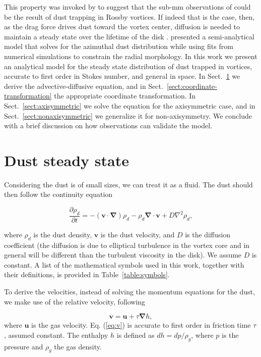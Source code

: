 \documentclass[apj]{emulateapj}
\newcommand{\pderiv}[2]{\frac{\partial #1}{\partial #2}}
\renewcommand{\v}[1]{{\boldsymbol{#1}}} %
\newcommand{\del}{\v{\nabla}}
\newcommand{\grad}{\del}
\newcommand{\Div}{\del\cdot}
\newcommand{\Laplace}{\nabla^2}
\newcommand{\Eq}[1]{Eq. (\ref{#1})}
\newcommand{\eq}[1]{\Eq{#1}}
\newcommand{\sect}[1]{Sect.~\ref{#1}}
\newcommand{\beq}{\begin{equation}}
\newcommand{\eeq}{\end{equation}}
\begin{document}
This property was invoked by \citet{Regaly12} to suggest that the 
sub-mm observations of \citet{Brown09} could be the result of dust
trapping in Rossby vortices. If indeed that is the case, then, 
as the drag force drives dust toward the vortex center, diffusion is
needed to maintain a steady state over the lifetime of the disk
\citep{Klahr-Henning97,Chavanis00}. \citet{Birnstiel13} presented a semi-analytical model that solves for the azimuthal dust 
distribution while using fits from numerical simulations
\citep{Pinilla12b} to constrain the radial morphology. In this work we present an analytical 
model for the steady state distribution of dust trapped in vortices, 
accurate to first order in Stokes number, and general in space. In 
\sect{sect:model-equations} we derive the
advective-diffusive equation, and in \sect{sect:coordinate-transformation} the appropriate coordinate
transformation. In \sect{sect:axisymmetric} we solve the equation for the axisymmetric
case, and in \sect{sect:nonaxisymmetric} we generalize it for non-axisymmetry. We conclude
with a brief discussion on how observations can validate the model. 

\section{Dust steady state} 
\label{sect:model-equations}

Considering the dust is of small sizes, we can treat it as a
fluid. The dust should then follow the continuity equation 

\beq
  \pderiv{\rho_d}{t} = -(\v{v}\cdot\del)\rho_d - \rho_d \Div{\v{v}} + D\Laplace{\rho_d},
  \label{eq:continuity}
\eeq

\noindent where $\rho_d$ is the dust density, $\v{v}$ is the dust
velocity, and $D$ is the diffusion coefficient (the diffusion is due
to elliptical turbulence in the vortex core and in general will be
different than the turbulent viscosity in the disk). We assume $D$ is
constant. A list of the mathematical symbols used in this work, together
with their definitions, is provided in Table~\ref{table:symbols}. 



To derive the velocities, instead of solving the momentum equations
for the dust, we make use of the relative velocity, following
\citet[see also \citealt{Youdin08}]{Youdin-Goodman05}

\beq
\v{v} = \v{u} + \tau  \grad{h}, 
\label{eq:v}
\eeq
\noindent where $\v{u}$ is the gas velocity. \eq{eq:v} is 
accurate to first order in friction time $\tau$, assumed 
constant. The enthalpy $h$ is defined as $dh = dp /\rho_g$, where $p$ 
is the pressure and $\rho_g$ the gas density. 
\end{document}
